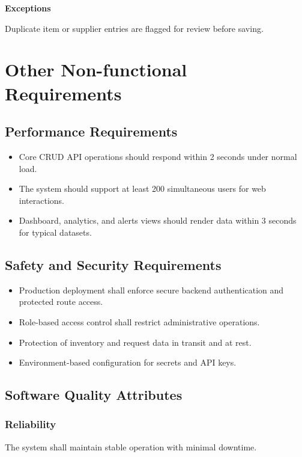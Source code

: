 \documentclass[12pt]{article}
\begin{document}
\textbf{Exceptions}

Duplicate item or supplier entries are flagged for review before saving.

\section{Other Non-functional Requirements}

\subsection{Performance Requirements}

\begin{itemize}
\item Core CRUD API operations should respond within 2 seconds under normal load.
\item The system should support at least 200 simultaneous users for web interactions.
\item Dashboard, analytics, and alerts views should render data within 3 seconds for typical datasets.
\end{itemize}

\subsection{Safety and Security Requirements}

\begin{itemize}
\item Production deployment shall enforce secure backend authentication and protected route access.
\item Role-based access control shall restrict administrative operations.
\item Protection of inventory and request data in transit and at rest.
\item Environment-based configuration for secrets and API keys.
\end{itemize}

\subsection{Software Quality Attributes}

\subsubsection{Reliability}

The system shall maintain stable operation with minimal downtime.
\end{document}
